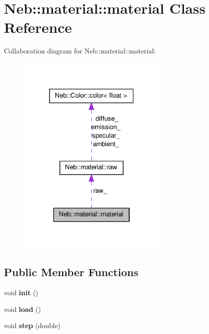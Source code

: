 \hypertarget{classNeb_1_1material_1_1material}{\section{\-Neb\-:\-:material\-:\-:material \-Class \-Reference}
\label{classNeb_1_1material_1_1material}
}


\-Collaboration diagram for \-Neb\-:\-:material\-:\-:material\-:\nopagebreak
\begin{figure}[H]
\begin{center}
\leavevmode
\includegraphics[width=208pt]{classNeb_1_1material_1_1material__coll__graph}
\end{center}
\end{figure}
\subsection*{\-Public \-Member \-Functions}
\begin{DoxyCompactItemize}
\item 
\hypertarget{classNeb_1_1material_1_1material_a5610c4dc9129ecc5fa6b28814fcf147e}{void {\bfseries init} ()}\label{classNeb_1_1material_1_1material_a5610c4dc9129ecc5fa6b28814fcf147e}

\item 
\hypertarget{classNeb_1_1material_1_1material_a70897de59b78a8fbd8ddf85e92385e98}{void {\bfseries load} ()}\label{classNeb_1_1material_1_1material_a70897de59b78a8fbd8ddf85e92385e98}

\item 
\hypertarget{classNeb_1_1material_1_1material_ae2b179fde85146dc1d8b0ca98e92cb7e}{void {\bfseries step} (double)}\label{classNeb_1_1material_1_1material_ae2b179fde85146dc1d8b0ca98e92cb7e}

\end{DoxyCompactItemize}
